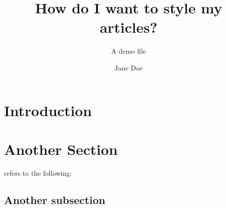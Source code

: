 \documentclass[a4paper]{article}
\title{How do I want to style my articles?}
\subtitle{A demo file}
\author{Jane Doe}
\begin{document}
\maketitle
\startmain

\section{Introduction}
\lipsum[1]
\citep{doe2023example}

\section{Another Section}
\citet{book1} refers to the following: \lipsum[2]

\subsection{Another subsection}
\lipsum[3-5]



\end{document}
